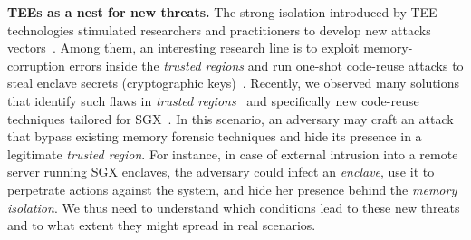 \vspace{0.5cm}
\noindent \textbf{TEEs as a nest for new threats.}
%
%
The strong isolation introduced by TEE technologies stimulated researchers and 
practitioners to develop new attacks 
vectors~\citep{foreshadow,Murdock2019plundervolt,203183,lee2017hacking}.
Among them, an interesting research line is to exploit memory-corruption 
errors inside the \emph{trusted regions} and run one-shot code-reuse attacks to 
steal enclave secrets (\eg cryptographic keys)~\citep{shacham2007geometry}.
Recently, we observed many solutions that identify such flaws in \emph{trusted 
regions}~\citep{teerex,tale-two-worlds} and specifically new code-reuse 
techniques tailored for SGX~\citep{lee2017hacking,biondo2018guard}.
In this scenario, an adversary may craft an attack that bypass 
existing memory forensic techniques and hide its presence in a legitimate 
\emph{trusted region}.
%
For instance, in case of external intrusion into a remote server running SGX 
enclaves, the adversary could infect an \emph{enclave}, use it to 
perpetrate actions against the system, and hide her presence behind the 
\emph{memory isolation}.
We thus need to understand which conditions lead to these new threats and to 
what extent they might spread in real scenarios.

